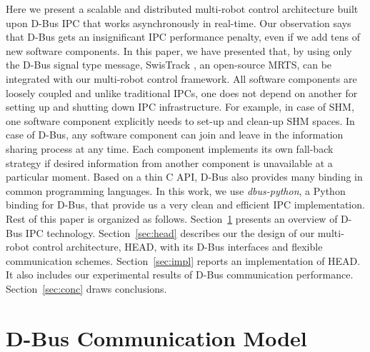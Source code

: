 \documentclass[draft]{ifacconf}
\begin{document}
Here we present a scalable and distributed multi-robot control architecture built upon D-Bus IPC that works asynchronously in real-time. Our observation says that D-Bus gets an insignificant IPC performance penalty, even if we add tens of new software components. In this paper, we have presented that, by using only the D-Bus signal type message, SwisTrack \citep{Lochmatter+2008}, an open-source MRTS, can be integrated with our multi-robot control framework. All software components are loosely coupled and unlike traditional IPCs, one does not depend on another for setting up and shutting down IPC infrastructure. For example, in case of SHM, one software component explicitly needs to set-up and clean-up SHM spaces. In case of D-Bus, any software component can join and leave in the information sharing process at any time. Each component implements its own fall-back strategy if desired information from another component is unavailable at a particular moment. Based on a thin C API, D-Bus also provides many binding in common programming languages. In this work, we use {\em dbus-python}, a Python binding for D-Bus, that provide us a very clean and efficient IPC implementation.\\
Rest of this paper is organized as follows. Section~\ref{sec:dbus} presents an overview of D-Bus IPC technology.  Section~\ref{sec:head} describes our the design of our multi-robot control architecture, HEAD, with its D-Bus interfaces and flexible communication schemes.  Section~\ref{sec:impl} reports an implementation of HEAD. It also includes  our experimental results of D-Bus communication performance. Section~\ref{sec:conc} draws conclusions.
\section{D-Bus Communication Model}
\label{sec:dbus}
\end{document}
